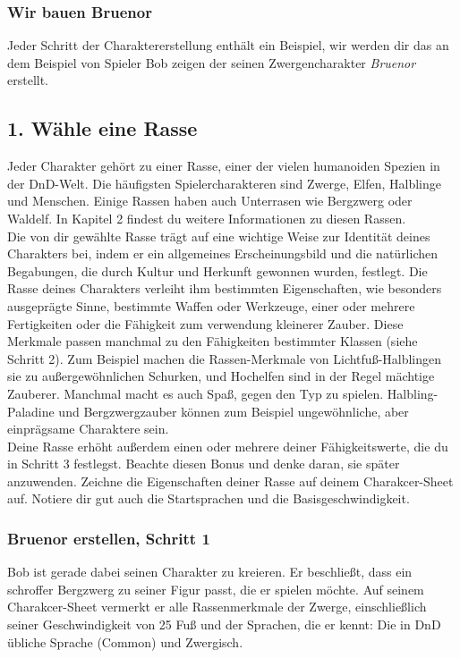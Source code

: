 \subsubsection{Wir bauen Bruenor}
Jeder Schritt der Charaktererstellung enthält ein Beispiel, wir werden dir das an dem Beispiel von Spieler Bob zeigen der seinen Zwergencharakter \textit{Bruenor} erstellt.


\subsection{1. Wähle eine Rasse}
Jeder Charakter gehört zu einer Rasse, einer der vielen humanoiden Spezien in der DnD-Welt. Die häufigsten Spielercharakteren sind Zwerge, Elfen, Halblinge und Menschen. Einige Rassen haben auch Unterrasen wie Bergzwerg oder Waldelf. In Kapitel 2 findest du weitere Informationen zu diesen Rassen.\\
Die von dir gewählte Rasse trägt auf eine wichtige Weise zur Identität deines Charakters bei, indem er ein allgemeines Erscheinungsbild und die natürlichen Begabungen, die durch Kultur und Herkunft gewonnen wurden, festlegt. Die Rasse deines Charakters verleiht ihm bestimmten Eigenschaften, wie besonders ausgeprägte Sinne, bestimmte Waffen oder Werkzeuge, einer oder mehrere Fertigkeiten oder die Fähigkeit zum verwendung kleinerer Zauber. Diese Merkmale passen manchmal zu den Fähigkeiten bestimmter Klassen (siehe Schritt 2). Zum Beispiel machen die Rassen-Merkmale von Lichtfuß-Halblingen sie zu außergewöhnlichen Schurken, und Hochelfen sind in der Regel mächtige Zauberer. Manchmal macht es auch Spaß, gegen den Typ zu spielen. Halbling-Paladine und Bergzwergzauber können zum Beispiel ungewöhnliche, aber einprägsame Charaktere sein.\\
Deine Rasse erhöht außerdem einen oder mehrere deiner Fähigkeitswerte, die du in Schritt 3 festlegst. Beachte diesen Bonus und denke daran, sie später anzuwenden. Zeichne die Eigenschaften deiner Rasse auf deinem Charakcer-Sheet auf. Notiere dir gut auch die Startsprachen und die Basisgeschwindigkeit.

\subsubsection{Bruenor erstellen, Schritt 1}
Bob ist gerade dabei seinen Charakter zu kreieren. Er beschließt, dass ein schroffer Bergzwerg zu seiner Figur passt, die er spielen möchte. Auf seinem Charakcer-Sheet vermerkt er alle Rassenmerkmale der Zwerge, einschließlich seiner Geschwindigkeit von 25 Fuß und der Sprachen, die er kennt: Die in DnD übliche Sprache (Common) und Zwergisch.

